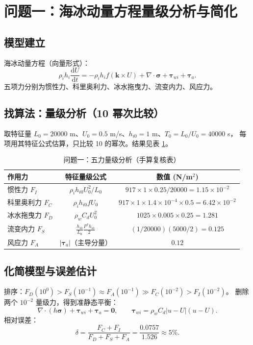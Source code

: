 \documentclass[12pt]{ctexart}
\newcommand{\dd}{\mathrm{d}}
\newcommand{\ve}{\boldsymbol}
\newcommand{\ts}{\boldsymbol{\tau}}
\newcommand{\sig}{\boldsymbol{\sigma}}
\begin{document}
\section{问题一：海冰动量方程量级分析与简化}
\subsection{模型建立}
海冰动量方程（向量形式）：
\begin{equation}
	\rho_i h_i \frac{\dd U}{\dd t}
	=-\rho_i h_i f(\ve{k}\times U)+\nabla\!\cdot\!\sig+\ts_{wi}+\ts_a.
	\label{eq:mom}
\end{equation}
五项力分别为惯性力、科里奥利力、冰水拖曳力、流变内力、风应力。

\subsection{找算法：量级分析（10 幂次比较）}
取特征量 $L_0=20000$ m、$U_0=0.5$ m/s、$h_{i0}=1$ m、$T_0=L_0/U_0=40000$ s，
每项用其特征公式估算，只比较 10 的幂次。结果见表 \ref{tab:q1}。

\begin{table}[H]
\centering\caption{问题一：五力量级分析（手算复核表）}
\label{tab:q1}
\begin{tabular}{lcc}
\toprule
作用力 & 特征量级公式 & 数值 (N/m$^2$) \\
\midrule
惯性力 $F_I$ & $\rho_i h_{i0}U_0^2/L_0$ & $917\!\times\!1\!\times\!0.25/20000=1.15\times10^{-2}$ \\
科里奥利力 $F_C$ & $\rho_i h_{i0} f U_0$ & $917\!\times\!1\!\times\!1.4\times10^{-4}\!\times\!0.5=6.42\times10^{-2}$ \\
冰水拖曳力 $F_D$ & $\rho_w C_d U_0^2$ & $1025\!\times\!0.005\!\times\!0.25=1.281$ \\
流变内力 $F_S$ & $\frac{h_{i0}}{L_0}\frac{P^* h_{i0}}{2}$ & $(1/20000)(5000/2)=0.125$ \\
风应力 $F_A$ & $|\ts_a|$（主导分量） & $0.12$ \\
\bottomrule
\end{tabular}
\end{table}

\subsection{化简模型与误差估计}
排序：$F_D(10^0)>F_S(10^{-1})\approx F_A(10^{-1})\gg F_C(10^{-2})>F_I(10^{-2})$。
删除两个 $10^{-2}$ 量级力，得到准静态平衡：
\begin{equation}
	\nabla\!\cdot\!(h\sig)+\ts_{wi}+\ts_a=\mathbf 0,\qquad
	\ts_{wi}=\rho_w C_d|u-U|(u-U).
	\label{eq:q1simple}
	\end{equation}
相对误差：
\begin{equation}
	\delta=\frac{F_C+F_I}{F_D+F_S+F_A}=\frac{0.0757}{1.526}\approx 5\%.
\end{equation}
\end{document}
